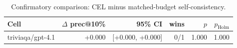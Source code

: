 \begin{table}[t]
\centering
\small
\begin{tabular}{lrrrrr}
\toprule
Cell & $\Delta$ prec@10\% & 95\% CI & wins & $p$ & $p_{\mathrm{Holm}}$ \\
\midrule
triviaqa/gpt-4.1 & +0.000 & [+0.000, +0.000] & 0/1 & 1.000 & 1.000 \\
\bottomrule
\end{tabular}
\caption{Confirmatory comparison: CEL minus matched-budget self-consistency.}
\label{tab:confirmatory}
\end{table}
